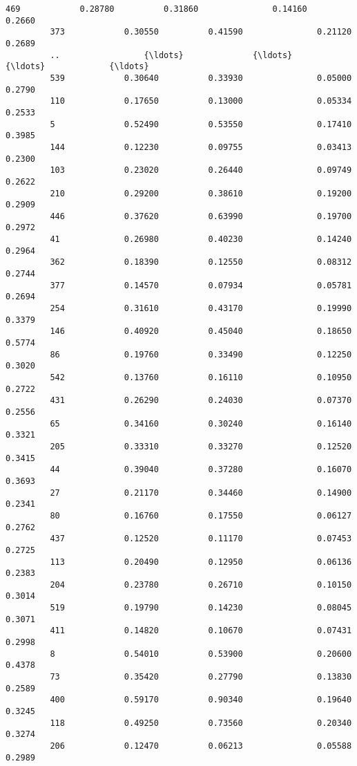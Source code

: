 \documentclass[11pt]{article}
\begin{document}
\begin{Verbatim}[commandchars=\\\{\}]
         469            0.28780          0.31860               0.14160          0.2660   
         373            0.30550          0.41590               0.21120          0.2689   
         ..                 {\ldots}              {\ldots}                   {\ldots}             {\ldots}   
         539            0.30640          0.33930               0.05000          0.2790   
         110            0.17650          0.13000               0.05334          0.2533   
         5              0.52490          0.53550               0.17410          0.3985   
         144            0.12230          0.09755               0.03413          0.2300   
         103            0.23020          0.26440               0.09749          0.2622   
         210            0.29200          0.38610               0.19200          0.2909   
         446            0.37620          0.63990               0.19700          0.2972   
         41             0.26980          0.40230               0.14240          0.2964   
         362            0.18390          0.12550               0.08312          0.2744   
         377            0.14570          0.07934               0.05781          0.2694   
         254            0.31610          0.43170               0.19990          0.3379   
         146            0.40920          0.45040               0.18650          0.5774   
         86             0.19760          0.33490               0.12250          0.3020   
         542            0.13760          0.16110               0.10950          0.2722   
         431            0.26290          0.24030               0.07370          0.2556   
         65             0.34160          0.30240               0.16140          0.3321   
         205            0.33310          0.33270               0.12520          0.3415   
         44             0.39040          0.37280               0.16070          0.3693   
         27             0.21170          0.34460               0.14900          0.2341   
         80             0.16760          0.17550               0.06127          0.2762   
         437            0.12520          0.11170               0.07453          0.2725   
         113            0.20490          0.12950               0.06136          0.2383   
         204            0.23780          0.26710               0.10150          0.3014   
         519            0.19790          0.14230               0.08045          0.3071   
         411            0.14820          0.10670               0.07431          0.2998   
         8              0.54010          0.53900               0.20600          0.4378   
         73             0.35420          0.27790               0.13830          0.2589   
         400            0.59170          0.90340               0.19640          0.3245   
         118            0.49250          0.73560               0.20340          0.3274   
         206            0.12470          0.06213               0.05588          0.2989   
         

\end{Verbatim}
\end{document}
